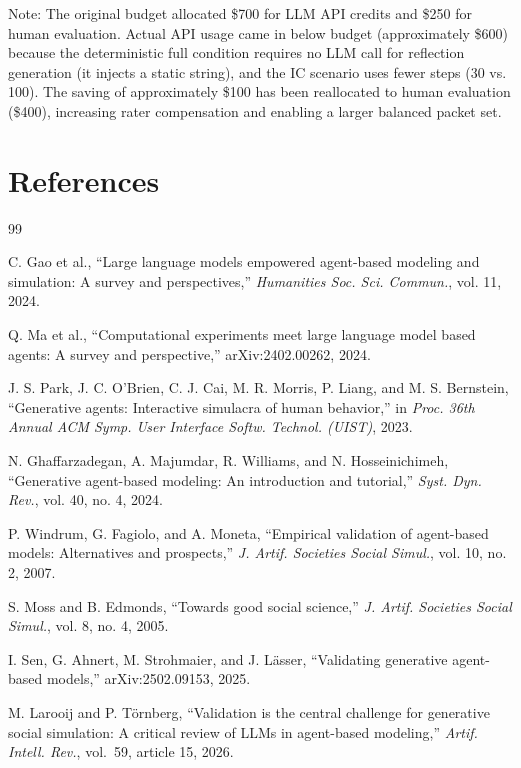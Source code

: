 \documentclass[11pt]{article}
\begin{document}
Note: The original budget allocated \$700 for LLM API credits and \$250 for human evaluation. Actual API usage came in below budget (approximately \$600) because the deterministic full condition requires no LLM call for reflection generation (it injects a static string), and the IC scenario uses fewer steps (30 vs. 100). The saving of approximately \$100 has been reallocated to human evaluation (\$400), increasing rater compensation and enabling a larger balanced packet set.

\section*{References}
\begin{thebibliography}{99}

C. Gao et al., ``Large language models empowered agent-based modeling and simulation: A survey and perspectives,'' \emph{Humanities Soc. Sci. Commun.}, vol. 11, 2024.

Q. Ma et al., ``Computational experiments meet large language model based agents: A survey and perspective,'' arXiv:2402.00262, 2024.

J. S. Park, J. C. O'Brien, C. J. Cai, M. R. Morris, P. Liang, and M. S. Bernstein, ``Generative agents: Interactive simulacra of human behavior,'' in \emph{Proc. 36th Annual ACM Symp. User Interface Softw. Technol. (UIST)}, 2023.

N. Ghaffarzadegan, A. Majumdar, R. Williams, and N. Hosseinichimeh, ``Generative agent-based modeling: An introduction and tutorial,'' \emph{Syst. Dyn. Rev.}, vol. 40, no. 4, 2024.

P. Windrum, G. Fagiolo, and A. Moneta, ``Empirical validation of agent-based models: Alternatives and prospects,'' \emph{J. Artif. Societies Social Simul.}, vol. 10, no. 2, 2007.

S. Moss and B. Edmonds, ``Towards good social science,'' \emph{J. Artif. Societies Social Simul.}, vol. 8, no. 4, 2005.

I. Sen, G. Ahnert, M. Strohmaier, and J. L\"{a}sser, ``Validating generative agent-based models,'' arXiv:2502.09153, 2025.

M. Larooij and P. T\"{o}rnberg, ``Validation is the central challenge for generative social simulation: A critical review of LLMs in agent-based modeling,'' \emph{Artif. Intell. Rev.}, vol.\ 59, article 15, 2026.


\end{thebibliography}
\end{document}
